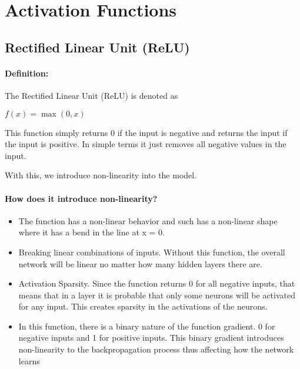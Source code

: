 \documentclass[12pt,a4paper]{article}
\begin{document}
\newpage
\section{Activation Functions}
\subsection{Rectified Linear Unit (ReLU)}

    \paragraph{Definition:}
     The Rectified Linear Unit (ReLU) is denoted as 

     \begin{center}
        \bf \( f(x) = \max(0, x) \)  
     \end{center}

     This function simply returns 0 if the input is negative
     and returns the input if the input is positive. In simple terms
     it just removes all negative values in the input.

     With this, we introduce non-linearity into the model.

     \paragraph{How does it introduce non-linearity?}
     \begin{itemize}
        \item The function has a non-linear behavior and such has a non-linear shape
        where it has a bend in the line at x = 0.
        \item Breaking linear combinations of inputs. Without this function, the overall
        network will be linear no matter how many hidden layers there are.
        \item Activation Sparsity. Since the function returns 0 for all negative inputs,
        that means that in a layer it is probable that only some neurons will be activated
        for any input. This creates sparsity in the activations of the neurons.
        \item In this function, there is a binary nature of the function gradient. 0 for
        negative inputs and 1 for positive inputs. This binary gradient
        introduces non-linearity to the backpropagation process thus affecting how the 
        network learns
     \end{itemize}
    
\end{document}
